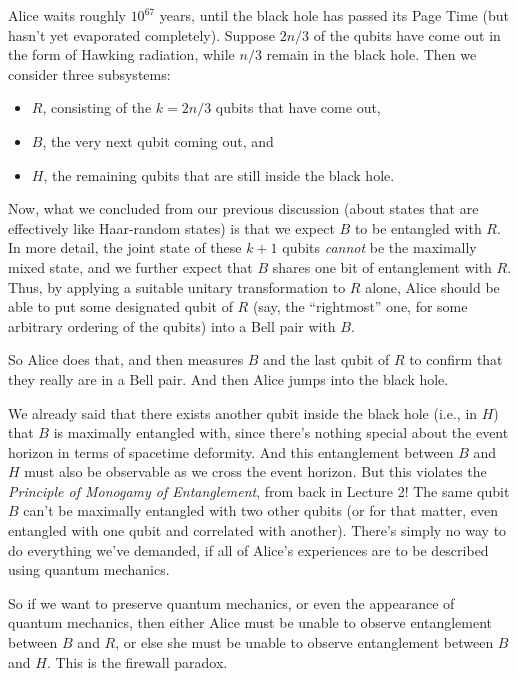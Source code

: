 \documentclass[12pt]{report}
\theoremstyle{plain}
\theoremstyle{definition}
\begin{document}
Alice waits roughly $10^{67}$ years, until the black hole has passed its Page Time (but hasn't yet evaporated completely).
Suppose $2n/3$ of the qubits
have come out in the form of Hawking radiation, while $n/3$ remain in the black hole.
Then we consider three subsystems:
\begin{itemize}
\item $R$, consisting of the $k=2n/3$ qubits that have come out,
\item $B$, the very next qubit coming out, and
\item $H$, the remaining qubits that are still inside the black hole.
\end{itemize}
Now, what we concluded from our previous discussion (about states
that are effectively like Haar-random states) is that we
expect $B$ to be entangled with $R$.
In more detail, the joint state of these $k+1$ qubits {\em cannot} be the maximally
mixed state, and we further expect that $B$ shares one bit of entanglement with $R$.
Thus, by applying
a suitable unitary transformation to $R$ alone, Alice should be able to put some designated qubit of $R$ (say,
the ``rightmost'' one, for some arbitrary ordering of the qubits) into a Bell pair with $B$.

So Alice does that, and then measures $B$ and the last qubit of $R$ to confirm that they really are in a Bell pair.  And then Alice jumps into the black hole.

We already said that there exists another qubit
inside the black hole (i.e., in $H$) that $B$ is maximally entangled with, since there's nothing special about the event horizon
in terms of spacetime deformity.
And this entanglement between $B$ and $H$ must also be observable as we cross the event horizon.
But this violates the {\em Principle of Monogamy of Entanglement}, from back in Lecture 2!  The same qubit $B$ can't be maximally entangled with two other qubits (or for that matter, even entangled with one qubit and correlated with another).  There's simply no way to do everything we've demanded,
if all of Alice's experiences are to be described using quantum mechanics.

So if we want to preserve quantum mechanics, or even the appearance of quantum mechanics, then either Alice must be unable to observe entanglement between $B$ and $R$, or
else she must be unable to observe entanglement between $B$ and $H$.  This is the firewall paradox.
\end{document}
